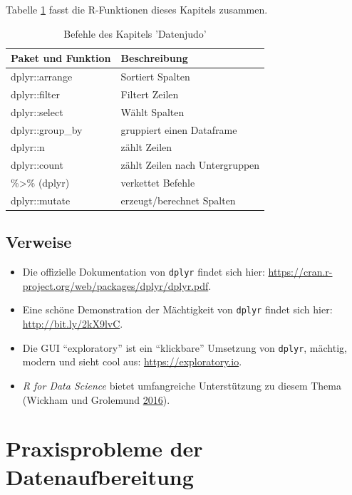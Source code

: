 \documentclass[12pt,ngerman,]{book}
\begin{document}
Tabelle \ref{tab:befehle-datenjudo} fasst die R-Funktionen dieses
Kapitels zusammen.

\begin{table}

\caption{\label{tab:befehle-datenjudo}Befehle des Kapitels 'Datenjudo'}
\centering
\begin{tabular}[t]{l|l}
\hline
Paket und Funktion & Beschreibung\\
\hline
dplyr::arrange & Sortiert Spalten\\
\hline
dplyr::filter & Filtert Zeilen\\
\hline
dplyr::select & Wählt Spalten\\
\hline
dplyr::group\_by & gruppiert einen Dataframe\\
\hline
dplyr::n & zählt Zeilen\\
\hline
dplyr::count & zählt Zeilen nach Untergruppen\\
\hline
\%>\% (dplyr) & verkettet Befehle\\
\hline
dplyr::mutate & erzeugt/berechnet Spalten\\
\hline
\end{tabular}
\end{table}

\section{Verweise}\label{verweise-2}

\begin{itemize}
\item
  Die offizielle Dokumentation von \texttt{dplyr} findet sich hier:
  \url{https://cran.r-project.org/web/packages/dplyr/dplyr.pdf}.
\item
  Eine schöne Demonstration der Mächtigkeit von \texttt{dplyr} findet
  sich hier: \url{http://bit.ly/2kX9lvC}.
\item
  Die GUI ``exploratory'' ist ein ``klickbare'' Umsetzung von
  \texttt{dplyr}, mächtig, modern und sieht cool aus:
  \url{https://exploratory.io}.
\item
  \emph{R for Data Science} bietet umfangreiche Unterstützung zu diesem
  Thema (Wickham und Grolemund \protect\hyperlink{ref-r4ds}{2016}).
\end{itemize}

\chapter{Praxisprobleme der
Datenaufbereitung}\label{praxisprobleme-der-datenaufbereitung}
\end{document}
